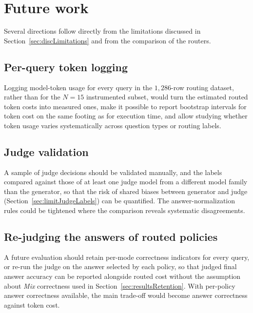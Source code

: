 \documentclass[english, bibtex]{kththesis}               %
\numberwithin{listing}{chapter}
\providecommand{\DIFaddtex}[1]{{\protect\color{blue} \sf #1}} %
\providecommand{\DIFdeltex}[1]{{\protect\color{red} \scriptsize #1}} %
\providecommand{\DIFaddbegin}{} %
\providecommand{\DIFaddend}{} %
\providecommand{\DIFdelbegin}{} %
\providecommand{\DIFdelend}{} %
\providecommand{\DIFadd}[1]{\texorpdfstring{\DIFaddtex{#1}}{#1}} %
\providecommand{\DIFdel}[1]{\texorpdfstring{\DIFdeltex{#1}}{}} %
\begin{document}
\section{Future work}
\label{sec:futureWork}

Several directions follow \DIFdelbegin \DIFdel{directly }\DIFdelend from the limitations discussed in Section~\ref{sec:discLimitations} \DIFaddbegin \DIFadd{and from the comparison of the routers}\DIFaddend .

\subsection{Per-query token logging} Logging model-token usage for every query in the $1{,}286$-row routing dataset, rather than for the $N = 15$ instrumented subset, would turn the estimated routed token costs into measured ones, make it possible to report bootstrap intervals for token cost on the same footing as for execution time, and allow studying whether token usage varies systematically across question types or routing labels.

\subsection{Judge validation} A sample of judge decisions should be validated manually, and the labels compared against those of at least one judge model from a different model family than the generator, so that the risk of shared biases between generator and judge (Section~\ref{sec:limitJudgeLabels}) can be quantified. The answer-normalization rules could be tightened where the comparison reveals systematic disagreements.

\subsection{Re-judging the answers of routed policies} A future evaluation should retain per-mode correctness indicators for every query, or re-run the judge on the answer selected by each policy, so that judged final answer accuracy can be reported alongside routed cost without the assumption about \emph{Mix} correctness used in Section~\ref{sec:resultsRetention}. With per-policy answer correctness available, the main trade-off would become answer correctness against token cost.
\end{document}
